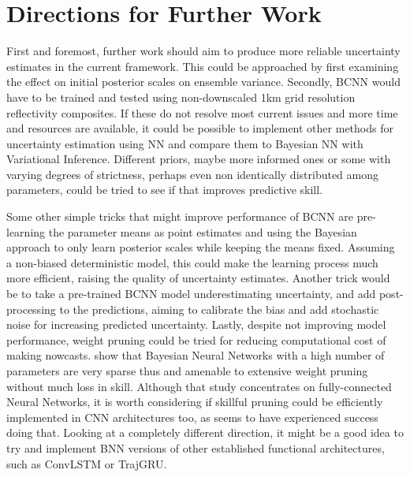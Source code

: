 \section{Directions for Further Work}

First and foremost, further work should aim to produce more reliable uncertainty estimates in the current framework. This could be approached by first examining the effect on initial posterior scales on ensemble variance. Secondly, BCNN would have to be trained and tested using non-downscaled 1km grid resolution reflectivity composites. If these do not resolve most current issues and more time and resources are available, it could be possible to implement other methods for uncertainty estimation using NN and compare them to Bayesian NN with Variational Inference. Different priors, maybe more informed ones or some with varying degrees of strictness, perhaps even non identically distributed among parameters, could be tried to see if that improves predictive skill. 

Some other simple tricks that might improve performance of BCNN are pre-learning the parameter means as point estimates and using the Bayesian approach to only learn posterior scales while keeping the means fixed. Assuming a non-biased deterministic model, this could make the learning process much more efficient, raising the quality of uncertainty estimates. Another trick would be to take a pre-trained BCNN model underestimating uncertainty, and add post-processing to the predictions, aiming to calibrate the bias and add stochastic noise for increasing predicted uncertainty. Lastly, despite not improving model performance, weight pruning could be tried for reducing computational cost of making nowcasts. \citet{blundell_weight_2015} show that Bayesian Neural Networks with a high number of parameters are very sparse thus and amenable to extensive weight pruning without much loss in skill. Although that study concentrates on fully-connected Neural Networks, it is worth considering if skillful pruning could be efficiently implemented in CNN architectures too, as \citet{shridhar_comprehensive_2019} seems to have experienced success doing that. 
Looking at a completely different direction, it might be a good idea to try and implement BNN versions of other established functional architectures, such as ConvLSTM or TrajGRU. 

